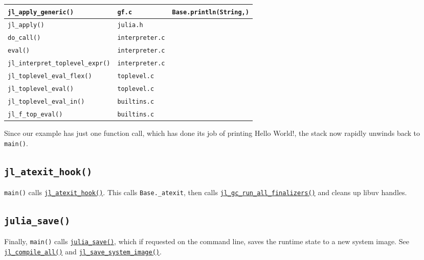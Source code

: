 \begin{table}[h]
\begin{tabulary}{\linewidth}{|L|L|L|}
\hline
\texttt{jl\_apply\_generic()} & \texttt{gf.c} & \texttt{Base.println(String,)} \\
\hline
\texttt{jl\_apply()} & \texttt{julia.h} &  \\
\hline
\texttt{do\_call()} & \texttt{interpreter.c} &  \\
\hline
\texttt{eval()} & \texttt{interpreter.c} &  \\
\hline
\texttt{jl\_interpret\_toplevel\_expr()} & \texttt{interpreter.c} &  \\
\hline
\texttt{jl\_toplevel\_eval\_flex()} & \texttt{toplevel.c} &  \\
\hline
\texttt{jl\_toplevel\_eval()} & \texttt{toplevel.c} &  \\
\hline
\texttt{jl\_toplevel\_eval\_in()} & \texttt{builtins.c} &  \\
\hline
\texttt{jl\_f\_top\_eval()} & \texttt{builtins.c} &  \\
\hline
\end{tabulary}

\end{table}



Since our example has just one function call, which has done its job of printing {\textquotedbl}Hello World!{\textquotedbl}, the stack now rapidly unwinds back to \texttt{main()}.



\hypertarget{8766302654766843311}{}


\subsection{\texttt{jl\_atexit\_hook()}}



\texttt{main()} calls \href{https://github.com/JuliaLang/julia/blob/master/src/init.c}{\texttt{jl\_atexit\_hook()}}. This calls \texttt{Base.\_atexit}, then calls \href{https://github.com/JuliaLang/julia/blob/master/src/gc.c}{\texttt{jl\_gc\_run\_all\_finalizers()}} and cleans up libuv handles.



\hypertarget{6367994784846959684}{}


\subsection{\texttt{julia\_save()}}



Finally, \texttt{main()} calls \href{https://github.com/JuliaLang/julia/blob/master/src/init.c}{\texttt{julia\_save()}}, which if requested on the command line, saves the runtime state to a new system image. See \href{https://github.com/JuliaLang/julia/blob/master/src/gf.c}{\texttt{jl\_compile\_all()}} and \href{https://github.com/JuliaLang/julia/blob/master/src/staticdata.c}{\texttt{jl\_save\_system\_image()}}.



